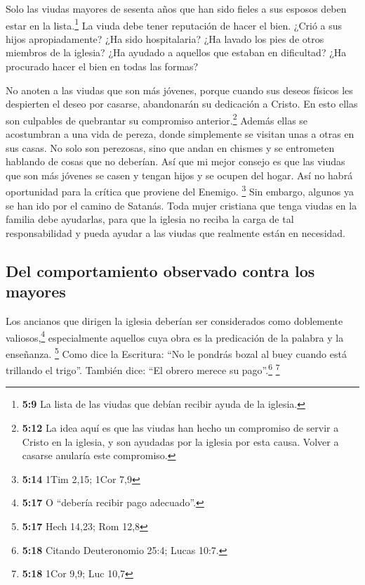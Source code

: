  Solo las viudas mayores de sesenta años que han sido
fieles a sus esposos deben estar en la lista.\footnote{\textbf{5:9} La
  lista de las viudas que debían recibir ayuda de la iglesia.}
 La viuda debe tener reputación de hacer el bien. ¿Crió a
sus hijos apropiadamente? ¿Ha sido hospitalaria? ¿Ha lavado los pies de
otros miembros de la iglesia? ¿Ha ayudado a aquellos que estaban en
dificultad? ¿Ha procurado hacer el bien en todas las formas?

 No anoten a las viudas que son más jóvenes, porque
cuando sus deseos físicos les despierten el deseo por casarse,
abandonarán su dedicación a Cristo.  En esto ellas son
culpables de quebrantar su compromiso anterior.\footnote{\textbf{5:12}
  La idea aquí es que las viudas han hecho un compromiso de servir a
  Cristo en la iglesia, y son ayudadas por la iglesia por esta causa.
  Volver a casarse anularía este compromiso.}  Además
ellas se acostumbran a una vida de pereza, donde simplemente se visitan
unas a otras en sus casas. No solo son perezosas, sino que andan en
chismes y se entrometen hablando de cosas que no deberían.
 Así que mi mejor consejo es que las viudas que son más
jóvenes se casen y tengan hijos y se ocupen del hogar. Así no habrá
oportunidad para la crítica que proviene del Enemigo. \footnote{\textbf{5:14}
  1Tim 2,15; 1Cor 7,9}  Sin embargo, algunos ya se han
ido por el camino de Satanás.  Toda mujer cristiana que
tenga viudas en la familia debe ayudarlas, para que la iglesia no reciba
la carga de tal responsabilidad y pueda ayudar a las viudas que
realmente están en necesidad.

\hypertarget{del-comportamiento-observado-contra-los-mayores}{%
\subsection{Del comportamiento observado contra los
mayores}\label{del-comportamiento-observado-contra-los-mayores}}

 Los ancianos que dirigen la iglesia deberían ser
considerados como doblemente valiosos,\footnote{\textbf{5:17} O
  ``debería recibir pago adecuado''.} especialmente aquellos cuya obra
es la predicación de la palabra y la enseñanza. \footnote{\textbf{5:17}
  Hech 14,23; Rom 12,8}  Como dice la Escritura: ``No le
pondrás bozal al buey cuando está trillando el trigo''. También dice:
``El obrero merece su pago''.\footnote{\textbf{5:18} Citando
  Deuteronomio 25:4; Lucas 10:7.} \footnote{\textbf{5:18} 1Cor 9,9; Luc
  10,7}

